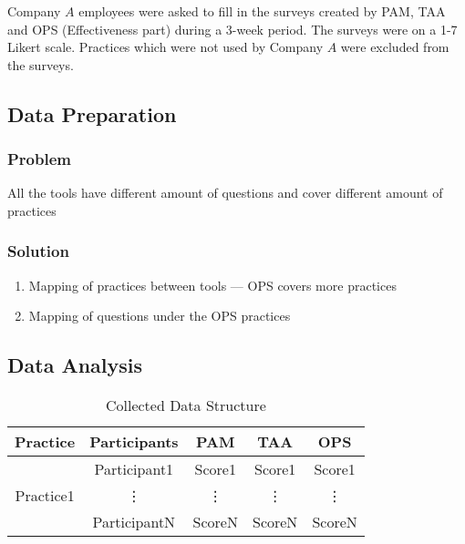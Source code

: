 Company $A$ employees were asked to fill in the surveys created by PAM, TAA and OPS (Effectiveness part) during a 3-week period. The surveys were on a 1-7 Likert scale.%
Practices which were not used by Company $A$ were excluded from the surveys.

\clearpage


\subsection*{Data Preparation}

\subsubsection*{Problem}
All the tools have different amount of questions and cover different amount of practices

\subsubsection*{Solution}
\begin{enumerate}
	\item Mapping of practices between tools --- OPS covers more practices
	\item Mapping of questions under the OPS practices
\end{enumerate}

\clearpage


\subsection*{Data Analysis}

\begin{table} [H]
\centering
	\begin{tabular}{| c | c | c | c | c |} \hline
	\textbf{Practice} & \textbf{Participants} & \textbf{PAM} & \textbf{TAA} & \textbf{OPS} \\ \hline
	\multirow{3}{*}{Practice1} & Participant1 & Score1 & Score1 & Score1 \\ \hhline{~----}
	& \vdots & \vdots & \vdots  & \vdots \\ \hhline{~----}
	& ParticipantN & ScoreN & ScoreN & ScoreN \\ \hline
	\end{tabular}
	\caption{Collected Data Structure}
	\label{table:data_structure}
\end{table}

